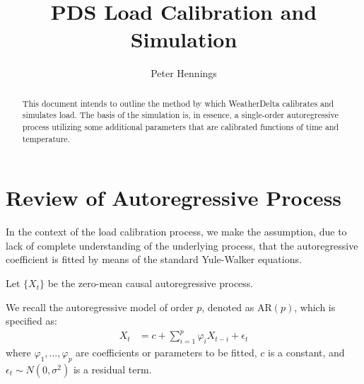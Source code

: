 \documentclass[11pt, a4paper]{article}
\begin{document}
\title{PDS Load Calibration and Simulation}

\author{Peter Hennings}

\maketitle

\begin{abstract}
  This document intends to outline the method by which WeatherDelta
  calibrates and simulates load.  The basis of the simulation is, in
  essence, a single-order autoregressive process utilizing some
  additional parameters that are calibrated functions of time and
  temperature.
\end{abstract}

\section{Review of Autoregressive Process}






In the context of the load calibration process, we make the
assumption, due to lack of complete understanding of the underlying
process, that the autoregressive coefficient is fitted by means of the
standard Yule-Walker equations.

Let $\{X_t\}$ be the zero-mean causal autoregressive process.

We recall the autoregressive model of order $p$, denoted as AR$(p)$,
which is specified as:
\begin{align*}
  X_t &= c + \sum_{i=1}^p \varphi_i X_{t-i} + \epsilon_t
\end{align*}
where $\varphi_1, \dots, \varphi_p$ are coefficients or parameters to
be fitted, $c$ is a constant, and $\epsilon_t \sim N(0,\sigma^2)$ is a
residual term.
\end{document}
